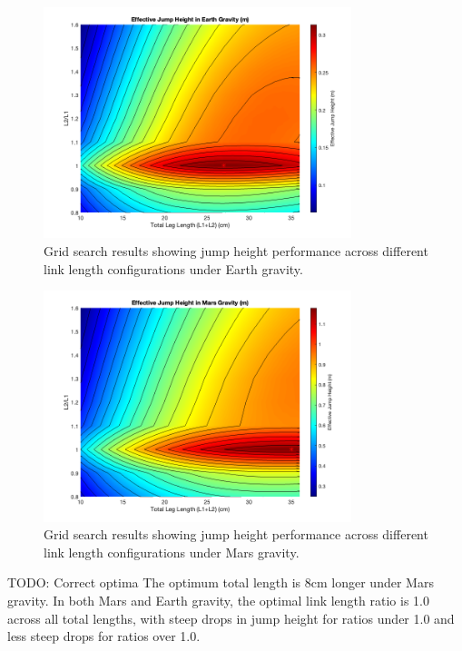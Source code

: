 \begin{figure}[h]
    \centering
    \includegraphics[width=0.8\textwidth]{Images/results/grid_search_results_earth_flat.png}
    \caption{Grid search results showing jump height performance across different link length configurations under Earth gravity.}
    \label{fig:results:grid_search_earth}
\end{figure}



\begin{figure}[h]
    \centering
    \includegraphics[width=0.8\textwidth]{Images/results/grid_search_results_mars_flat.png}
    \caption{Grid search results showing jump height performance across different link length configurations under Mars gravity.}
    \label{fig:results:grid_search_mars}
\end{figure}

TODO: Correct optima
The optimum total length is 8cm longer under Mars gravity. In both Mars and Earth gravity, the optimal link length ratio is 1.0 across all total lengths, with steep drops in jump height for ratios under 1.0 and less steep drops for ratios over 1.0. 

